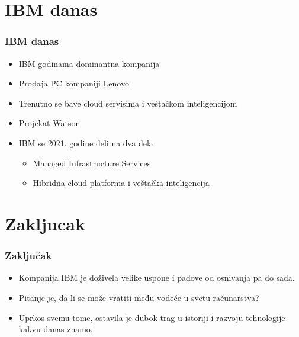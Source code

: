 \documentclass{beamer}
\begin{document}
\section{IBM danas}

\begin{frame}[fragile]\frametitle{IBM danas}
	\begin{itemize}	
		\item IBM godinama dominantna kompanija
		\item Prodaja PC kompaniji Lenovo 
		\item Trenutno se bave cloud servisima i veštačkom inteligencijom
            \item Projekat Watson
            \item IBM se 2021. godine deli na dva dela
            \begin{itemize}
	       \item Managed Infrastructure Services
	       \item Hibridna cloud platforma i veštačka inteligencija
	    \end{itemize}
            
	\end{itemize}
\end{frame}

\section{Zakljucak}

\begin{frame}[fragile]\frametitle{Zaključak}
	\begin{itemize}	
	\item Kompanija IBM je doživela velike uspone i padove od osnivanja pa do sada.
        \item Pitanje je, da li se može vratiti među vodeće u svetu računarstva?
        \item Uprkos svemu tome, ostavila je dubok trag u istoriji i razvoju tehnologije kakvu danas znamo.
	\end{itemize}
\end{frame}
\end{document}
